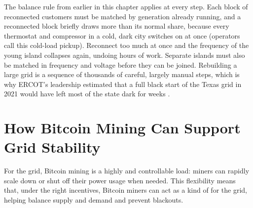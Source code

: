 The balance rule from earlier in this chapter applies at every step. Each block of reconnected customers must be matched by generation already running, and a reconnected block briefly draws more than its normal share, because every thermostat and compressor in a cold, dark city switches on at once (operators call this cold-load pickup). Reconnect too much at once and the frequency of the young island collapses again, undoing hours of work. Separate islands must also be matched in frequency and voltage before they can be joined. Rebuilding a large grid is a sequence of thousands of careful, largely manual steps, which is why ERCOT's leadership estimated that a full black start of the Texas grid in 2021 would have left most of the state dark for weeks \autocite{MagnessTestimony2021,Douglas2021Seconds}. %


\section{How Bitcoin Mining Can Support Grid Stability}

For the grid, Bitcoin mining is a highly  and controllable load: miners can rapidly scale down or shut off their power usage when needed. This flexibility means that, under the right incentives, Bitcoin miners can act as a kind of  for the grid, helping balance supply and demand and prevent blackouts.

